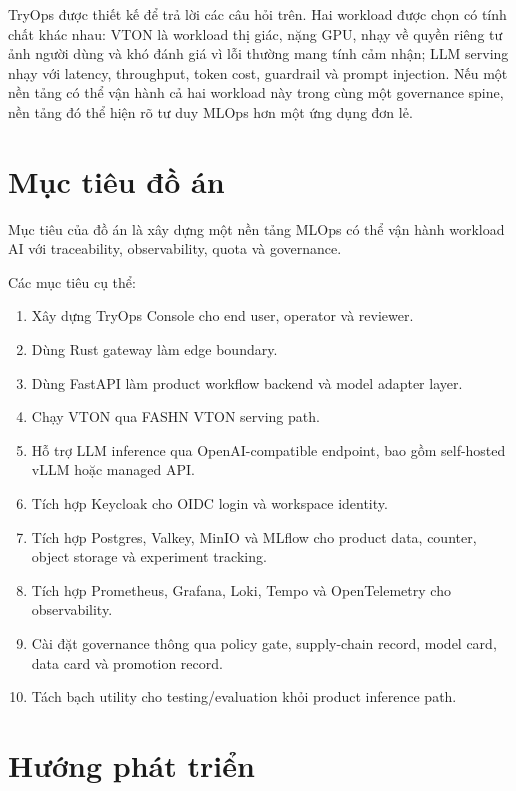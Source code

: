 \documentclass[12pt,a4paper,oneside]{report}
\begin{document}
TryOps được thiết kế để trả lời các câu hỏi trên. Hai workload được chọn có tính chất khác nhau: VTON là workload thị giác, nặng GPU, nhạy về quyền riêng tư ảnh người dùng và khó đánh giá vì lỗi thường mang tính cảm nhận; LLM serving nhạy với latency, throughput, token cost, guardrail và prompt injection. Nếu một nền tảng có thể vận hành cả hai workload này trong cùng một governance spine, nền tảng đó thể hiện rõ tư duy MLOps hơn một ứng dụng đơn lẻ.

\section{Mục tiêu đồ án}

Mục tiêu của đồ án là xây dựng một nền tảng MLOps có thể vận hành workload AI với traceability, observability, quota và governance.

Các mục tiêu cụ thể:

\begin{enumerate}
  \item Xây dựng TryOps Console cho end user, operator và reviewer.
  \item Dùng Rust gateway làm edge boundary.
  \item Dùng FastAPI làm product workflow backend và model adapter layer.
  \item Chạy VTON qua FASHN VTON serving path.
  \item Hỗ trợ LLM inference qua OpenAI-compatible endpoint, bao gồm self-hosted vLLM hoặc managed API.
  \item Tích hợp Keycloak cho OIDC login và workspace identity.
  \item Tích hợp Postgres, Valkey, MinIO và MLflow cho product data, counter, object storage và experiment tracking.
  \item Tích hợp Prometheus, Grafana, Loki, Tempo và OpenTelemetry cho observability.
  \item Cài đặt governance thông qua policy gate, supply-chain record, model card, data card và promotion record.
  \item Tách bạch utility cho testing/evaluation khỏi product inference path.
\end{enumerate}

\section{Hướng phát triển}
\end{document}
